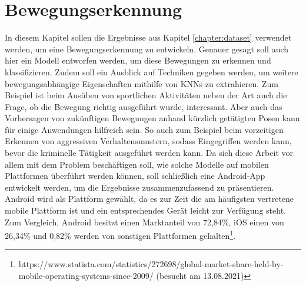 \chapter{Bewegungserkennung}\label{chapter:motion-detection}
In diesem Kapitel sollen die Ergebnisse aus Kapitel \ref{chapter:dataset}
verwendet werden, um eine Bewegungserkennung zu entwickeln. Genauer gesagt soll
auch hier ein Modell entworfen werden, um diese Bewegungen zu erkennen und
klassifizieren. Zudem soll ein Ausblick auf Techniken gegeben werden, um weitere
bewegungsabhängige Eigenschaften mithilfe von KNNs zu extrahieren. Zum Beispiel
ist beim Ausüben von sportlichen Aktivitäten neben der Art auch die Frage, ob
die Bewegung richtig ausgeführt wurde, interessant. Aber auch das Vorhersagen
von zukünftigen Bewegungen anhand kürzlich getätigten Posen kann für einige
Anwendungen hilfreich sein. So auch zum Beispiel beim vorzeitigen Erkennen von
aggressiven Verhaltensmustern, sodass Eingegriffen werden kann, bevor die
kriminelle Tätigkeit ausgeführt werden kann. Da sich diese Arbeit vor allem mit
dem Problem beschäftigen soll, wie solche Modelle auf mobilen Plattformen
überführt werden können, soll schließlich eine Android-App entwickelt werden, um
die Ergebnisse zusammenzufassend zu präsentieren. Android wird als Plattform
gewählt, da es zur Zeit die am häufigsten vertretene mobile Plattform ist und
ein entsprechendes Gerät leicht zur Verfügung steht. Zum Vergleich, Android
besitzt einen Marktanteil von 72,84\%, iOS einen von 26,34\% und 0,82\% werden
von sonstigen Plattformen
gehalten\footnote{https://www.statista.com/statistics/272698/global-market-share-held-by-mobile-operating-systems-since-2009/
(besucht am 13.08.2021)}.


